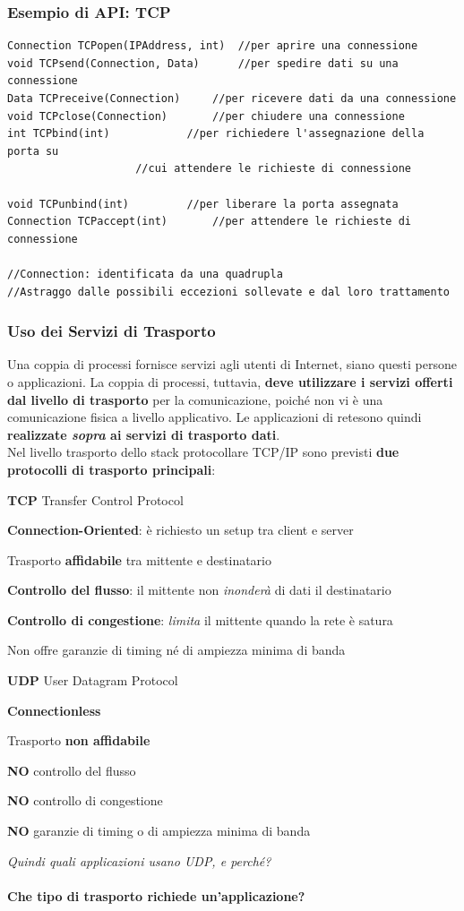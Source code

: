\documentclass[10pt]{article}
\begin{document}
\subsubsection{Esempio di API: TCP}
\begin{lstlisting}
Connection TCPopen(IPAddress, int)	//per aprire una connessione
void TCPsend(Connection, Data)		//per spedire dati su una connessione
Data TCPreceive(Connection)		//per ricevere dati da una connessione
void TCPclose(Connection)		//per chiudere una connessione
int TCPbind(int)			//per richiedere l'assegnazione della porta su
					//cui attendere le richieste di connessione

void TCPunbind(int)			//per liberare la porta assegnata
Connection TCPaccept(int)		//per attendere le richieste di connessione

//Connection: identificata da una quadrupla
//Astraggo dalle possibili eccezioni sollevate e dal loro trattamento
\end{lstlisting}
\pagebreak
\subsubsection{Uso dei Servizi di Trasporto}
Una coppia di processi fornisce servizi agli utenti di Internet, siano questi persone o applicazioni. La coppia di processi, tuttavia, \textbf{deve utilizzare i servizi offerti dal livello di trasporto} per la comunicazione, poiché non vi è una comunicazione fisica a livello applicativo. Le applicazioni di retesono quindi \textbf{realizzate \textit{sopra} ai servizi di trasporto dati}.\\
Nel livello trasporto dello stack protocollare TCP/IP sono previsti \textbf{due protocolli di trasporto principali}:
\begin{list}{}{}
\item \textbf{TCP} Transfer Control Protocol
\begin{list}{}{}
\item \textbf{Connection-Oriented}: è richiesto un setup tra client e server
\item Trasporto \textbf{affidabile} tra mittente e destinatario
\item \textbf{Controllo del flusso}: il mittente non \textit{inonderà} di dati il destinatario
\item \textbf{Controllo di congestione}: \textit{limita} il mittente quando la rete è satura
\item Non offre garanzie di timing né di ampiezza minima di banda
\end{list}
\item \textbf{UDP} User Datagram Protocol
\begin{list}{}{}
\item \textbf{Connectionless}
\item Trasporto \textbf{non affidabile}
\item \textbf{NO} controllo del flusso
\item \textbf{NO} controllo di congestione
\item \textbf{NO} garanzie di timing o di ampiezza minima di banda
\item \textit{Quindi quali applicazioni usano UDP, e perché?}
\end{list}
\end{list}
\paragraph{Che tipo di trasporto richiede un'applicazione?}
\end{document}
